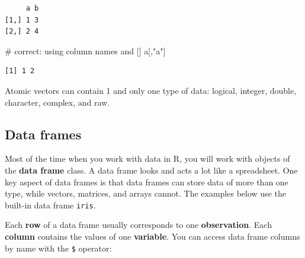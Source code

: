 \documentclass[
  13,
  letterpaper,
]{report}
\newenvironment{Shaded}{\begin{snugshade}}{\end{snugshade}}
\newcommand{\CommentTok}[1]{\textcolor[rgb]{0.37,0.37,0.37}{#1}}
\newcommand{\NormalTok}[1]{\textcolor[rgb]{0.00,0.23,0.31}{#1}}
\newcommand{\SpecialCharTok}[1]{\textcolor[rgb]{0.37,0.37,0.37}{#1}}
\newcommand{\StringTok}[1]{\textcolor[rgb]{0.13,0.47,0.30}{#1}}
\begin{document}
\begin{verbatim}
     a b
[1,] 1 3
[2,] 2 4
\end{verbatim}

\begin{Shaded}
\end{Shaded}

\begin{Shaded}
\begin{Highlighting}[]
\CommentTok{\# correct: using column names and []}
\NormalTok{a[,}\StringTok{"a"}\NormalTok{]}
\end{Highlighting}
\end{Shaded}

\begin{verbatim}
[1] 1 2
\end{verbatim}

Atomic vectors can contain 1 and only one type of data: logical,
integer, double, character, complex, and raw.

\subsection{Data frames}\label{sec-object-struct-df}

Most of the time when you work with data in R, you will work with
objects of the \textbf{data frame} class. A data frame looks and acts a
lot like a spreadsheet. One key aspect of data frames is that data
frames can store data of more than one type, while vectors, matrices,
and arrays cannot. The examples below use the built-in data frame
\texttt{iris}.

Each \textbf{row} of a data frame usually corresponds to one
\textbf{observation}. Each \textbf{column} contains the values of one
\textbf{variable}. You can access data frame columns by name with the
\texttt{\$} operator:

\begin{Shaded}
\end{Shaded}
\end{document}

